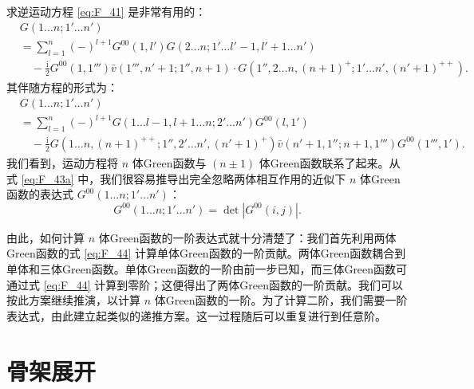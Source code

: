 求逆运动方程 \ref{eq:F_41} 是非常有用的：
\begin{align}
 & G(1\dots n;1'\dots n')\nonumber \\
 & =\sum^{n}_{l=1}(-)^{l+1}G^{00}(1,l')G(2\dots n;1'\dots l'-1,l'+1\dots n')\nonumber \\
 & \quad-\frac{\mathrm{i}}{2}G^{00}(1,1''')\bar{v}(1''',n'+1;1'',n+1)\cdot G(1'',2\dots n,(n+1)^{+};1'\dots n',(n'+1)^{++}).\label{eq:F_43a}
\end{align}
其伴随方程的形式为：
\begin{align}
 & G(1\dots n;1'\dots n')\nonumber \\
 & =\sum^{n}_{l=1}(-)^{l+1}G(1\dots l-1,l+1\dots n;2'\dots n')G^{00}(l,1')\nonumber \\
 & \quad-\frac{\mathrm{i}}{2}G(1\dots n,(n+1)^{++};1'',2'\dots n',(n'+1)^{+})\bar{v}(n'+1,1'';n+1,1''')G^{00}(1''',1').\label{eq:F_43b}
\end{align}
我们看到，运动方程将 $n$ 体Green函数与 $(n\pm1)$ 体Green函数联系了起来。从式 \ref{eq:F_43a}
中，我们很容易推导出完全忽略两体相互作用的近似下 $n$ 体Green函数的表达式 $G^{00}(1\dots n;1'\dots n')$：
\begin{equation}
G^{00}(1\dots n;1'\dots n')=\det|G^{00}(i,j)|.\label{eq:F_44}
\end{equation}

由此，如何计算 $n$ 体Green函数的一阶表达式就十分清楚了：我们首先利用两体Green函数的式 \ref{eq:F_44}
计算单体Green函数的一阶贡献。两体Green函数耦合到单体和三体Green函数。单体Green函数的一阶由前一步已知，而三体Green函数可通过式
\ref{eq:F_44} 计算到零阶；这便得出了两体Green函数的一阶贡献。我们可以按此方案继续推演，以计算 $n$ 体Green函数的一阶。为了计算二阶，我们需要一阶表达式，由此建立起类似的递推方案。这一过程随后可以重复进行到任意阶。

\section{骨架展开}

